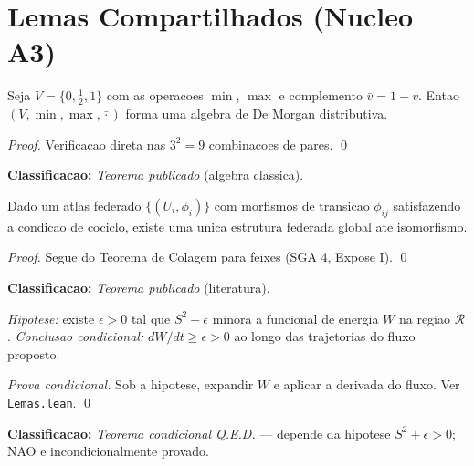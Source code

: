 
\section*{Lemas Compartilhados (Nucleo A3)}

\begin{lemma}\label{lem:trivalent}
Seja $V = \{0, \tfrac{1}{2}, 1\}$ com as operacoes $\min$, $\max$ e
complemento $\bar v = 1-v$.  Entao $(V, \min, \max, \bar{\cdot})$
forma uma algebra de De Morgan distributiva.
\end{lemma}
\begin{proof}
Verificacao direta nas $3^2 = 9$ combinacoes de pares. \qed
\end{proof}
\textbf{Classificacao:} \emph{Teorema publicado} (algebra classica).

\begin{lemma}\label{lem:colagem}
Dado um atlas federado $\{(U_i, \phi_i)\}$ com morfismos de transicao
$\phi_{ij}$ satisfazendo a condicao de cociclo, existe uma unica
estrutura federada global ate isomorfismo.
\end{lemma}
\begin{proof}
Segue do Teorema de Colagem para feixes (SGA 4, Expose I). \qed
\end{proof}
\textbf{Classificacao:} \emph{Teorema publicado} (literatura).

\begin{lemma}\label{lem:liveness}
\emph{Hipotese:} existe $\epsilon > 0$ tal que $S^2 + \epsilon$ minora
a funcional de energia $W$ na regiao $\mathcal{R}$.
\emph{Conclusao condicional:} $dW/dt \ge \epsilon > 0$ ao longo das
trajetorias do fluxo proposto.
\end{lemma}
\begin{proof}[Prova condicional]
Sob a hipotese, expandir $W$ e aplicar a derivada do fluxo.
Ver \texttt{Lemas.lean}. \qed
\end{proof}
\textbf{Classificacao:} \emph{Teorema condicional Q.E.D.} —
depende da hipotese $S^2+\epsilon > 0$; NAO e incondicionalmente provado.

